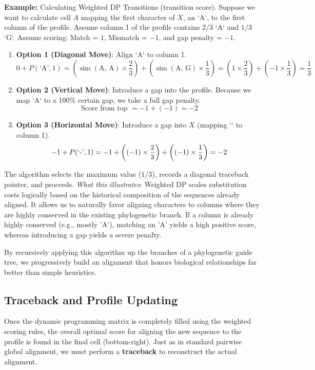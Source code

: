 \textbf{Example:} Calculating Weighted DP Transitions (transition score).
Suppose we want to calculate cell $A$ mapping the first character of $X$, an `A`, to the first column of the profile.
Assume column 1 of the profile contains $2/3$ `A` and $1/3$ `G`.
Assume scoring: Match = $1$, Mismatch = $-1$, and gap penalty = $-1$.
\begin{enumerate}
    \item \textbf{Option 1 (Diagonal Move)}: Align `A` to column 1.
    \[ 0 + P(\text{`A'}, 1) = \left( \operatorname{sim}(\text{A, A}) \times \frac{2}{3} \right) + \left( \operatorname{sim}(\text{A, G}) \times \frac{1}{3} \right) = \left(1 \times \frac{2}{3}\right) + \left(-1 \times \frac{1}{3}\right) = \frac{1}{3} \]
    \item \textbf{Option 2 (Vertical Move)}: Introduce a gap into the profile.
    Because we map `A` to a 100\% certain gap, we take a full gap penalty.
    \[ \text{Score from top } = -1 + (-1) = -2 \]
    \item \textbf{Option 3 (Horizontal Move)}: Introduce a gap into $X$ (mapping `\text{-}` to column 1).
    \[ -1 + P(\text{`\text{-}'}, 1) = -1 + \left((-1) \times \frac{2}{3}\right) + \left((-1) \times \frac{1}{3}\right) = -2 \]
\end{enumerate}
The algorithm selects the maximum value ($1/3$), records a diagonal traceback pointer, and proceeds.
\textit{What this illustrates}: Weighted DP scales substitution costs logically based on the historical composition of the sequences already aligned. It allows us to naturally favor aligning characters to columns where they are highly conserved in the existing phylogenetic branch. If a column is already highly conserved (e.g., mostly 'A'), matching an 'A' yields a high positive score, whereas introducing a gap yields a severe penalty.


By recursively applying this algorithm up the branches of a phylogenetic guide tree, we progressively build an alignment that honors biological relationships far better than simple heuristics.

\subsection{Traceback and Profile Updating}

Once the dynamic programming matrix is completely filled using the weighted scoring rules, the overall optimal score for aligning the new sequence to the profile is found in the final cell (bottom-right). Just as in standard pairwise global alignment, we must perform a \textbf{traceback} to reconstruct the actual alignment.

